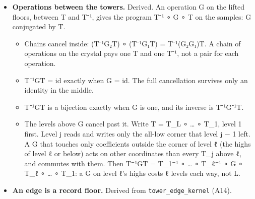 \begin{itemize}
\begin{itemize}
\item keymath does not see the identity: T⁻¹ ∘ T emitted as steps runs every one of them.
\item In the proved program T is 69 steps (8 field steps and 61) and T⁻¹ is 60. F on the samples needs only the 8 field steps.
\item When the record holds the samples, F on the samples saves every step of T and T⁻¹.
\item When the record holds only the crystal, F ∘ T⁻¹ is the way down to the samples, and T⁻¹'s steps are its price.
\end{itemize}
\item \textbf{Operations between the towers.} Derived. An operation G on the lifted floors, between T and T⁻¹, gives the program T⁻¹ ∘ G ∘ T on the samples: G conjugated by T.

\begin{itemize}
\item Chains cancel inside: (T⁻¹G₂T) ∘ (T⁻¹G₁T) = T⁻¹(G₂G₁)T. A chain of operations on the crystal pays one T and one T⁻¹, not a pair for each operation.
\item T⁻¹GT = id exactly when G = id. The full cancellation survives only an identity in the middle.
\item T⁻¹GT is a bijection exactly when G is one, and its inverse is T⁻¹G⁻¹T.
\item The levels above G cancel past it. Write T = T\_\allowbreak{}L ∘ … ∘ T\_\allowbreak{}1, level 1 first. Level j reads and writes only the all-low corner that level j − 1 left. A G that touches only coefficients outside the corner of level ℓ (the highs of level ℓ or below) acts on other coordinates than every T\_\allowbreak{}j above ℓ, and commutes with them. Then T⁻¹GT = T\_\allowbreak{}1⁻¹ ∘ … ∘ T\_\allowbreak{}ℓ⁻¹ ∘ G ∘ T\_\allowbreak{}ℓ ∘ … ∘ T\_\allowbreak{}1: a G on level ℓ's highs costs ℓ levels each way, not L.
\end{itemize}
\item \textbf{An edge is a record floor.} Derived from \texttt{tower\_\allowbreak{}edge\_\allowbreak{}kernel} (A14).


\end{itemize}
